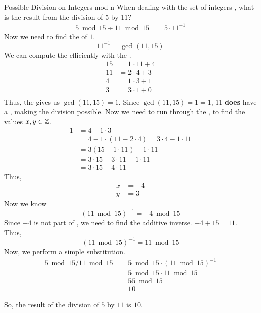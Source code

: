 \begin{example}[]{Possible Division on Integers mod n}
  When dealing with the set of integers , what is the result from the division of 5 by 11?
  \tcblower{}
  \begin{align*}
    5 \bmod 15 \div 11 \bmod 15 &= 5 \cdot 11^{-1}
  \end{align*}
  Now we need to find the  of $1$.
  \begin{equation*}
    11^{-1} = \gcd(11, 15)
  \end{equation*}
  We can compute the  efficiently with the .
  \begin{align*}
    15 &= 1 \cdot 11 + 4 \\
    11 &= 2 \cdot 4 + 3 \\
    4 &= 1 \cdot 3 + 1 \\
    3 &= 3 \cdot 1 + 0 \\
  \end{align*}
  Thus, the  gives us $\gcd(11, 15) = 1$.
  Since $\gcd(11, 15) = 1 = 1$, 11 \textbf{does} have a , making the division possible.
  Now we need to run through the , to find the values $x, y \in \operatorname{\mathbb{Z}}$.
  \begin{align*}
    1 &= 4 - 1 \cdot 3 \\
      &= 4 - 1 \cdot (11 - 2 \cdot 4) = 3 \cdot 4 - 1 \cdot 11 \\
      &= 3 (15 - 1 \cdot 11) - 1 \cdot 11 \\
      &= 3 \cdot 15 - 3 \cdot 11 - 1 \cdot 11 \\
      &= 3 \cdot 15 - 4 \cdot 11
  \end{align*}
  Thus,
  \begin{align*}
    x &= -4 \\
    y &= 3
  \end{align*}
  Now we know
  \begin{equation*}
    {(11 \bmod 15)}^{-1} = -4 \bmod 15
  \end{equation*}
  Since $-4$ is not part of , we need to find the additive inverse.
  $-4 + 15 = 11$.
  Thus,
  \begin{equation*}
    {(11 \bmod 15)}^{-1} = 11 \bmod 15
  \end{equation*}
  Now, we perform a simple substitution.
  \begin{align*}
    5 \bmod 15 / 11 \bmod 15 &= 5 \bmod 15 \cdot {(11 \bmod 15)}^{-1} \\
                             &= 5 \bmod 15 \cdot 11 \bmod 15 \\
                             &= 55 \bmod 15 \\
                             &= 10
  \end{align*}

  So, the result of the division of $5$ by $11$ is $10$.
\end{example}

